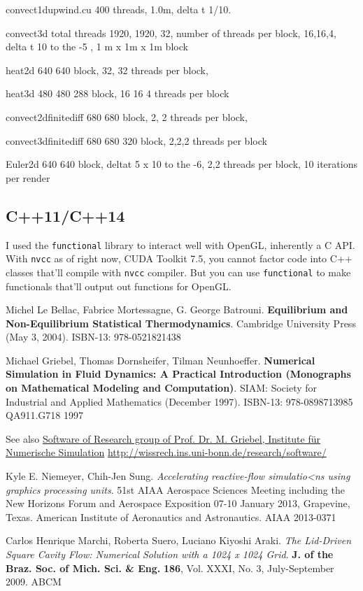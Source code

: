 \documentclass[10pt]{amsart}
\begin{document}
convect1dupwind.cu 400 threads, 1.0m, delta t 1/10.

convect3d total threads 1920, 1920, 32, number of threads per block, 16,16,4, delta t 10 to the -5 , 1 m x 1m x 1m block

heat2d 640 640 block, 32, 32 threads per block,

heat3d 480 480 288 block, 16 16 4 threads per block 

convect2dfinitediff 680 680 block, 2, 2 threads per block,

convect3dfinitediff 680 680 320 block, 2,2,2 threads per block

Euler2d 640 640 block, deltat 5 x 10 to the -6, 2,2 threads per block, 10 iterations per render

\subsection{C++11/C++14}

I used the \verb|functional| library to interact well with OpenGL, inherently a C API.  With \verb|nvcc| as of right now, CUDA Toolkit 7.5, you cannot factor code into C++ classes that'll compile with \verb|nvcc| compiler.  But you can use \verb|functional| to make functionals that'll output out functions for OpenGL.  


\begin{thebibliography}{9}
Michel Le Bellac, Fabrice Mortessagne, G. George Batrouni.  \textbf{Equilibrium and Non-Equilibrium Statistical Thermodynamics}.  Cambridge University Press (May 3, 2004).  ISBN-13: 978-0521821438

Michael Griebel, Thomas Dornsheifer, Tilman Neunhoeffer.  \textbf{Numerical Simulation in Fluid Dynamics: A Practical Introduction (Monographs on Mathematical Modeling and Computation)}.  SIAM: Society for Industrial and Applied Mathematics (December 1997).  ISBN-13: 978-0898713985  QA911.G718  1997
  
See also \href{http://wissrech.ins.uni-bonn.de/research/software/}{Software of Research group of Prof. Dr. M. Griebel, Institute f\"{u}r Numerische Simulation} \url{http://wissrech.ins.uni-bonn.de/research/software/}

Kyle E. Niemeyer, Chih-Jen Sung.  \emph{Accelerating reactive-flow simulatio<ns using graphics processing units}.  51st AIAA Aerospace Sciences Meeting including the New Horizons Forum and Aerospace Exposition 07-10 January 2013, Grapevine, Texas. American Institute of Aeronautics and Astronautics.  AIAA 2013-0371

  Carlos Henrique Marchi, Roberta Suero, Luciano Kiyoshi Araki.  \emph{The Lid-Driven Square Cavity Flow: Numerical Solution with a 1024 x 1024 Grid}.  \textbf{J. of the Braz. Soc. of Mich. Sci. \& Eng.}  \textbf{186}, Vol. XXXI, No. 3, July-September 2009.  ABCM


\end{thebibliography}
\end{document}
